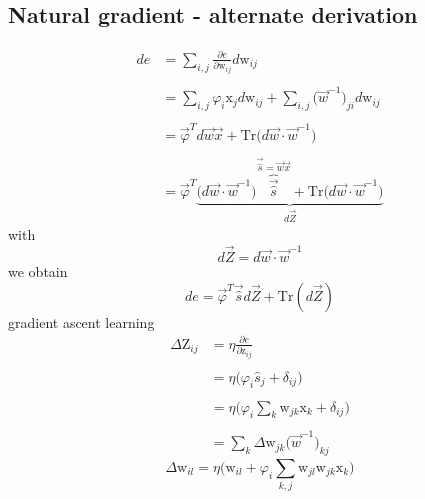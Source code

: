 \subsection{Natural gradient - alternate derivation}
\begin{equation}
	\begin{array}{ll}
	de & = \sum\limits_{i,j} \frac{\partial e}{\partial \mathrm{w}_{ij}}
		d \mathrm{w}_{ij} \\\\
	& = \sum\limits_{i,j} \varphi_i \mathrm{x}_j d \mathrm{w}_{ij} + 
		\sum\limits_{i,j} \big( \vec{w}^{-1} \big)_{ji} d 
		\mathrm{w}_{ij} \\\\
	& = \vec{\varphi}^T d \vec{w} \vec{x} + \mathrm{Tr} \big(
		d \vec{w} \cdot \vec{w}^{-1} \big) \\\\
	& = \vec{\varphi}^T 
		\underbrace{ \big( d \vec{w} \cdot \vec{w}^{-1} \big) 
		\overbrace{ \vec{\widehat{s}} }^{\vec{\widehat{s}} = \vec{w}
			\vec{x}}
		+ \mathrm{Tr} \big( d \vec{w} \cdot
		\vec{w}^{-1} \big) }_{d \vec{Z}}
	\end{array}
\end{equation}
with 
\begin{equation}
	d \vec{Z} = d \vec{w} \cdot \vec{w}^{-1} 
\end{equation}
we obtain
\begin{equation}
	de = \vec{\varphi}^T \vec{\widehat{s}} d \vec{Z} + \mathrm{Tr}(d\vec{Z})
\end{equation}
gradient ascent learning
\begin{equation}
	\begin{array}{ll}
	\Delta \mathrm{Z}_{ij} & = \eta \frac{\partial e}
		{\partial \mathrm{z}_{ij}} \\\\
	& = \eta \big( \varphi_i \widehat{s}_j + \delta_{ij} \big) \\\\
	& = \eta \Big( \varphi_i \sum\limits_k \mathrm{w}_{jk} \mathrm{x}_k
		+ \delta_{ij} \Big) \\\\
	& = \sum\limits_k \Delta \mathrm{w}_{jk} \big( \vec{w}^{-1} \big)_{kj}
	\end{array}
\end{equation}
\begin{equation}
	\Delta \mathrm{w}_{il} = \eta \Big( \mathrm{w}_{il} + \varphi_i
		\sum\limits_{k,j} \mathrm{w}_{jl} \mathrm{w}_{jk} \mathrm{x}_k
		\Big)
\end{equation}
